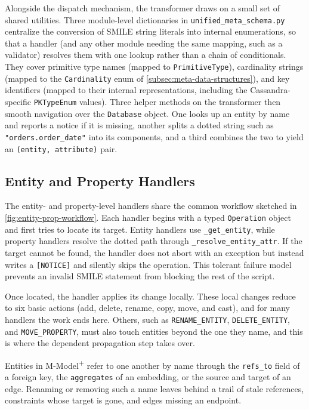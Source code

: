   Alongside the dispatch mechanism, the transformer draws on a small set of
  shared utilities. Three module-level dictionaries in
  \texttt{unified\_meta\_schema.py} centralize the conversion of SMILE
  string literals into internal enumerations, so that a handler (and any
  other module needing the same mapping, such as a validator) resolves
  them with one lookup rather than a chain of conditionals. They cover
  primitive type names (mapped to \texttt{PrimitiveType}), cardinality
  strings (mapped to the \texttt{Cardinality} enum of
  \autoref{subsec:meta-data-structures}), and key identifiers (mapped to
  their internal representations, including the Cassandra-specific
  \texttt{PKTypeEnum} values). Three helper methods on the transformer
  then smooth navigation over the \texttt{Database} object. One looks up
  an entity by name and reports a notice if it is missing, another splits
  a dotted string such as \texttt{"orders.order\_date"} into its
  components, and a third combines the two to yield an
  \texttt{(entity, attribute)} pair.


\subsection{Entity and Property Handlers}\label{subsec:transformer-entity-prop}
The entity- and property-level handlers share the common workflow sketched
  in \autoref{fig:entity-prop-workflow}. Each handler begins with a typed
  \texttt{Operation} object and first tries to locate its target. Entity
  handlers use \texttt{\_get\_entity}, while property handlers resolve the
  dotted path through \texttt{\_resolve\_entity\_attr}. If the target cannot
  be found, the handler does not abort with an exception but instead writes a \texttt{[NOTICE]} and silently skips the operation. This tolerant
  failure model prevents an invalid SMILE statement from blocking the rest
  of the script.

 Once located, the handler applies its change locally. These local changes
  reduce to six basic actions (add, delete, rename, copy, move, and cast),
  and for many handlers the work ends here. Others, such as
  \texttt{RENAME\_ENTITY}, \texttt{DELETE\_ENTITY}, and \texttt{MOVE\_PROPERTY}, must also touch entities beyond the one they
  name, and this is where the dependent propagation step takes over.

  Entities in M-Model\textsuperscript{+} refer to one another by name
  through the \texttt{refs\_to} field of a foreign key, the
  \texttt{aggregates} of an embedding, or the source and target of an edge.
  Renaming or removing such a name leaves behind a trail of stale
  references, constraints whose target is gone, and edges missing an             endpoint.

